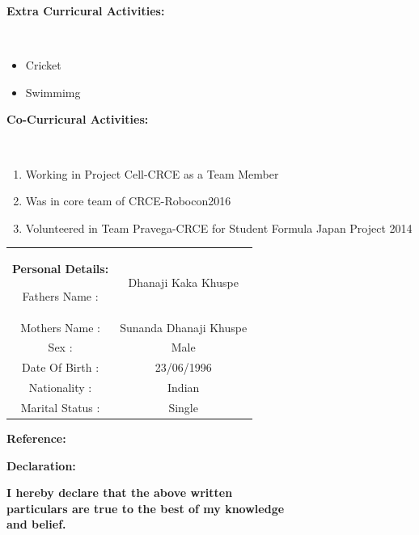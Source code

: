 \documentclass[a4paper]{article}
\begin{document}
\begin{flushleft}
				\begin{Large}\vspace{0.1in}\textbf{Extra Curricural Activities:}\end{Large}\\
				\begin{itemize}
					\item Cricket
					\item Swimmimg
				\end{itemize}
				
			\begin{Large}\vspace{0.1in}\textbf{Co-Curricural Activities:}\end{Large}\\
			\begin{enumerate}
					\item Working in Project Cell-CRCE as a Team Member
					\item Was in core team of CRCE-Robocon2016
					\item Volunteered in Team Pravega-CRCE for Student Formula Japan Project 2014
			\end{enumerate}
			

			\begin{tabular}{ cc }
				\begin{Large}\vspace{0.1in}\textbf{Personal Details:}\end{Large}
				\hfill Fathers Name : & Dhanaji Kaka Khuspe \\ 
				\hfill Mothers Name : & Sunanda Dhanaji Khuspe \\  
				\hfill Sex : & Male   \\ 
				\hfill Date Of Birth : & 23/06/1996  \\
				\hfill Nationality : & Indian  \\
				\hfill Marital Status : & Single
			\end{tabular}
			
			\begin{Large}\vspace{0.1in}\textbf{Reference:}\end{Large}
			
			
			\begin{Large}\vspace{0.2in}\textbf{Declaration:}\end{Large}
			  \textbf{I hereby declare that the above written}\\\hspace{1.25in}\textbf{particulars are true to the best of my knowledge}\\\hspace{1.25in}\textbf{and belief.}\\
			  

\end{flushleft}
\end{document}
